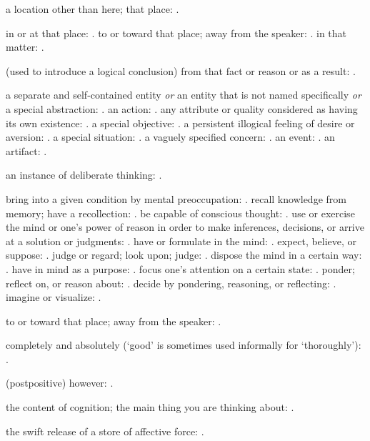   a location other than here; that place: .

  in or at that place: . to or toward that place; away from the speaker: . in that matter: .

  (used to introduce a logical conclusion) from that fact or reason or as a result: .

  a separate and self-contained entity \textit{or} an entity that is not named specifically \textit{or} a special abstraction: . an action: . any attribute or quality considered as having its own existence: . a special objective: . a persistent illogical feeling of desire or aversion: . a special situation: . a vaguely specified concern: . an event: . an artifact: .

  an instance of deliberate thinking: .

  bring into a given condition by mental preoccupation: . recall knowledge from memory; have a recollection: . be capable of conscious thought: . use or exercise the mind or one's power of reason in order to make inferences, decisions, or arrive at a solution or judgments: . have or formulate in the mind: . expect, believe, or suppose: . judge or regard; look upon; judge: . dispose the mind in a certain way: . have in mind as a purpose: . focus one's attention on a certain state: . ponder; reflect on, or reason about: . decide by pondering, reasoning, or reflecting: . imagine or visualize: .

  to or toward that place; away from the speaker: .

  completely and absolutely (`good' is sometimes used informally for `thoroughly'): .

  (postpositive) however: .

  the content of cognition; the main thing you are thinking about: .

  the swift release of a store of affective force: .

